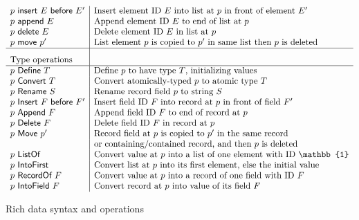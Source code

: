 \documentclass[english,submission]{programming}
\theoremstyle{definition}
\begin{document}
\begin{figure}[h]
{\begin{minipage}{\textwidth}
\[\begin{array}{l|l}
  p \textsf{ insert } E \textsf{ before } E' & \textrm{Insert element ID $E$ into list at $p$ in front of element $E'$}\\
  p \textsf{ append } E & \textrm{Append element ID $E$ to end of list at $p$}\\

  p \textsf{ delete } E & \textrm{Delete element ID $E$ in list at $p$}\\

  p \textsf{ move } p' & \textrm{List element $p$ is copied to $p'$ in same list then $p$ is deleted}\\
  \hline

  \textrm{Type operations} & \rule[0pt]{0pt}{16pt}\\
  \hline
  p \textsf{ Define } T & \textrm{Define $p$ to have type $T$, initializing values}\\
  p \textsf{ Convert } T & \textrm{Convert atomically-typed $p$ to atomic type $T$}\\

  p \textsf{ Rename } S & \textrm{Rename record field $p$ to string $S$}\\

  p \textsf{ Insert } F \textsf{ before } F' & \textrm{Insert field ID $F$ into record at $p$ in front of field $F'$}\\
  p \textsf{ Append } F & \textrm{Append field ID $F$ to end of record at $p$}\\

  p \textsf{ Delete } F & \textrm{Delete field ID $F$ in record at $p$}\\

  p \textsf{ Move } p' & \textrm{Record field at $p$ is copied to $p'$ in the same record}\\
  & \textrm{or containing\slash contained record, and then $p$ is deleted}\\


  p \textsf{ ListOf } & \textrm{Convert value at $p$ into a list of one element with ID $\mathbb{1}$}\\
  p \textsf{ IntoFirst } & \textrm{Convert list at $p$ into its first element, else the initial value} \\

  p \textsf{ RecordOf } F & \textrm{Convert value at $p$ into a record of one field with ID $F$} \\
  p \textsf{ IntoField } F & \textrm{Convert record at $p$ into value of its field $F$} \\

\end{array}\]
\end{minipage}
}
\caption{Rich data syntax and operations}
\label{fig:rich-data}
\end{figure}
\end{document}
